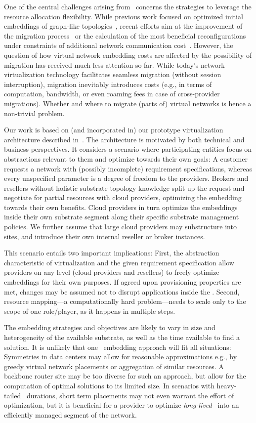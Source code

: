 \documentclass[conference,10pt]{IEEEtran}
\newcommand{\CloudNet}{\text{CloudNet}}
\newcommand{\CloudNets}{\text{CloudNets}}
\begin{document}
One of the central challenges arising from \CloudNets\ concerns the
strategies to leverage the resource allocation flexibility. While
previous work focused on optimized initial embeddings of graph-like
topologies~\cite{infocom2009}, recent efforts aim at the improvement
of the migration process~\cite{clnetvee11} or the calculation of the
most beneficial reconfigurations under constraints of additional
network communication cost~\cite{clwardsigc11}. However, the
question of how virtual network embedding costs are affected by the
possibility of migration has received much less attention so far. While
today's network virtualization technology facilitates seamless
migration (without session interruption), migration inevitably
introduces costs (e.g., in terms of computation, bandwidth, or even
roaming fees in case of cross-provider migrations). Whether and
where to migrate (parts of) virtual networks is hence a non-trivial
problem.

Our work is based on (and incorporated in) our prototype
virtualization architecture described in~\cite{visa09virtu}. The
architecture is motivated by both technical and business
perspectives. It considers a scenario where participating entities
focus on abstractions relevant to them and optimize towards their
own goals: A customer requests a network with (possibly incomplete)
requirement specifications, whereas every unspecified parameter is a
degree of freedom to the providers. Brokers and resellers without
holistic substrate topology knowledge split up the request and
negotiate for partial resources with cloud providers, optimizing the
embedding towards their own benefits. Cloud providers in turn
optimize the embeddings inside their own substrate segment along
their specific substrate management policies. We further assume that
large cloud providers may substructure into sites, and introduce
their own internal reseller or broker instances.

This scenario entails two important implications: First, the
abstraction characteristic of virtualization and the given
requirement specification allow providers on any level (cloud
providers and resellers) to freely optimize embeddings for their own
purposes. If agreed upon provisioning properties are met, changes
may be assumed not to disrupt applications inside the \CloudNet.
Second, resource mapping---a computationally hard problem---needs to
scale only to the scope of one role/player, as it happens in
multiple steps.

The embedding strategies and objectives are likely to vary in size
and heterogeneity of the available substrate, as well as the time
available to find a solution. It is unlikely that one \CloudNets\
embedding approach will fit all situations: Symmetries in data
centers may allow for reasonable approximations e.g., by greedy
virtual network placements or aggregation of similar resources. A
backbone router site may be too diverse for such an approach, but
allow for the computation of optimal solutions to its limited size.
In scenarios with heavy-tailed \CloudNet\ durations, short term
placements may not even warrant the effort of optimization, but it
is beneficial for a provider to optimize \emph{long-lived} \CloudNets\
into an efficiently managed segment of the network.
\end{document}
